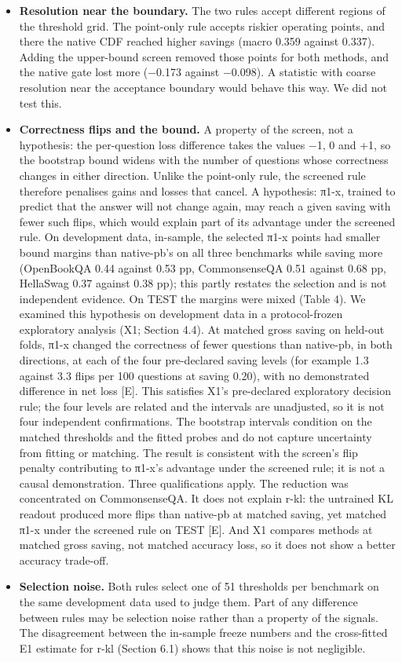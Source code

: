 \begin{itemize}
\tightlist
\item
  \textbf{Resolution near the boundary.} The two rules accept different regions of the threshold grid. The point-only rule accepts riskier operating
  points, and there the native CDF reached higher savings (macro 0.359 against 0.337). Adding the upper-bound screen removed those points for both
  methods, and the native gate lost more (−0.173 against −0.098). A statistic with coarse resolution near the acceptance boundary would behave this
  way. We did not test this.
\item
  \textbf{Correctness flips and the bound.} A property of the screen, not a hypothesis: the per-question loss difference takes the values −1, 0 and +1, so the bootstrap bound widens with the number of questions whose correctness changes in either direction. Unlike the point-only rule, the screened rule therefore penalises gains and losses that cancel. A hypothesis: π1-x, trained to predict that the answer will not change again, may reach a given saving with fewer such flips, which would explain part of its advantage under the screened rule. On development data, in-sample, the selected π1-x points had smaller bound margins than native-pb's on all three benchmarks while saving more (OpenBookQA 0.44 against 0.53 pp, CommonsenseQA 0.51 against 0.68 pp, HellaSwag 0.37 against 0.38 pp); this partly restates the selection and is not independent evidence. On TEST the margins were mixed (Table 4). We examined this hypothesis on development data in a protocol-frozen exploratory analysis (X1; Section 4.4). At matched gross saving on held-out folds, π1-x changed the correctness of fewer questions than native-pb, in both directions, at each of the four pre-declared saving levels (for example 1.3 against 3.3 flips per 100 questions at saving 0.20), with no demonstrated difference in net loss {[}E{]}. This satisfies X1's pre-declared exploratory decision rule; the four levels are related and the intervals are unadjusted, so it is not four independent confirmations. The bootstrap intervals condition on the matched thresholds and the fitted probes and do not capture uncertainty from fitting or matching. The result is consistent with the screen's flip penalty contributing to π1-x's advantage under the screened rule; it is not a causal demonstration. Three qualifications apply. The reduction was concentrated on CommonsenseQA. It does not explain r-kl: the untrained KL readout produced more flips than native-pb at matched saving, yet matched π1-x under the screened rule on TEST {[}E{]}. And X1 compares methods at matched gross saving, not matched accuracy loss, so it does not show a better accuracy trade-off.
\item
  \textbf{Selection noise.} Both rules select one of 51 thresholds per benchmark on the same development data used to judge them. Part of any
  difference between rules may be selection noise rather than a property of the signals. The disagreement between the in-sample freeze
  numbers and the cross-fitted E1 estimate for r-kl (Section 6.1) shows that this noise is not negligible.
\end{itemize}

